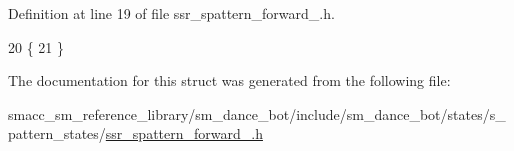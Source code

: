 Definition at line 19 of file ssr\+\_\+spattern\+\_\+forward\+\_.\+h.


\begin{DoxyCode}
20   \{
21   \}
\end{DoxyCode}


The documentation for this struct was generated from the following file\+:\begin{DoxyCompactItemize}
\item 
smacc\+\_\+sm\+\_\+reference\+\_\+library/sm\+\_\+dance\+\_\+bot/include/sm\+\_\+dance\+\_\+bot/states/s\+\_\+pattern\+\_\+states/\hyperlink{ssr__spattern__forward__1_8h}{ssr\+\_\+spattern\+\_\+forward\+\_.\+h}\end{DoxyCompactItemize}

